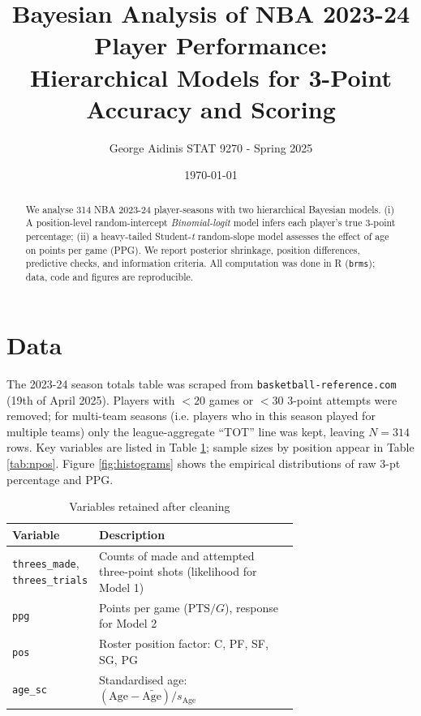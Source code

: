 \documentclass[11pt,letterpaper,onecolumn]{article}
\title{\vspace{-1cm}\bfseries
Bayesian Analysis of NBA 2023-24 Player Performance:\\[2pt]
Hierarchical Models for 3-Point Accuracy and Scoring}
\author{George Aidinis \qquad STAT 9270 - Spring 2025}
\date{\today}
\begin{document}
\maketitle\vspace{-1em}

\begin{abstract}
\noindent
We analyse 314 NBA 2023-24 player-seasons with two hierarchical Bayesian
models.  (i) A position-level random-intercept \emph{Binomial-logit} model
infers each player's true 3-point percentage; (ii) a heavy-tailed
Student-\textit{t} random-slope model assesses the effect of age on points per
game (PPG).  We report posterior shrinkage, position differences, predictive
checks, and information criteria.  All computation was done in \textsf{R}
(\texttt{brms}); data, code and figures are reproducible.
\end{abstract}

\section{Data}\label{sec:data}

The 2023-24 season totals table was scraped from
\texttt{basketball-reference.com} (19th of April 2025).  Players with
$<\!20$ games or $<\!30$ 3-point attempts were removed; for multi-team
seasons (i.e. players who in this season played for multiple teams) only the league-aggregate ``TOT'' line was kept, leaving
$N=314$ rows.  Key variables are listed in
Table \ref{tab:variables}; sample sizes by position appear in
Table \ref{tab:npos}.  Figure \ref{fig:histograms} shows the empirical
distributions of raw 3-pt percentage and PPG.

\begin{table}[h]
\centering
\begin{tabular}{lp{0.7\linewidth}}
\toprule
Variable & Description \\
\midrule
\texttt{threes\_made}, \texttt{threes\_trials} &
 Counts of made and attempted three-point shots (likelihood for Model 1)\\
\texttt{ppg} & Points per game ($\text{PTS}/G$), response for Model 2\\
\texttt{pos} & Roster position factor: C, PF, SF, SG, PG\\
\texttt{age\_sc} & Standardised age: $(\text{Age}-\bar{\text{Age}})/s_{\text{Age}}$\\
\bottomrule
\end{tabular}
\caption{Variables retained after cleaning\label{tab:variables}}
\end{table}
\end{document}
